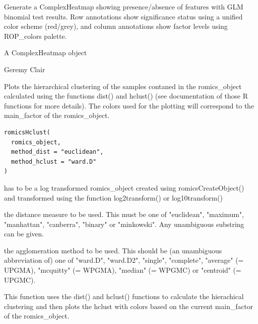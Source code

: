 \documentclass[a4paper]{book}
\begin{document}
%
\begin{Details}
Generate a ComplexHeatmap showing presence/absence of features with GLM binomial test results. Row annotations show significance status using a unified color scheme (red/grey), and column annotations show factor levels using ROP\_colors palette.
\end{Details}
%
\begin{Value}
A ComplexHeatmap object
\end{Value}
%
\begin{Author}
Geremy Clair
\end{Author}
%
\begin{Description}
Plots the hierarchical clustering of the samples contaned in the romics\_object calculated using the functions dist() and hclust() (see documentation of those R functions for more details). The colors used for the plotting will correspond to the main\_factor of the romics\_object.
\end{Description}
%
\begin{Usage}
\begin{verbatim}
romicsHclust(
  romics_object,
  method_dist = "euclidean",
  method_hclust = "ward.D"
)
\end{verbatim}
\end{Usage}
%
\begin{Arguments}
\begin{ldescription}
\item[\code{romics\_object}] has to be a log transformed romics\_object created using romicsCreateObject() and transformed using the function log2transform() or log10transform()

\item[\code{method\_dist}] the distance measure to be used. This must be one of "euclidean", "maximum", "manhattan", "canberra", "binary" or "minkowski". Any unambiguous substring can be given.

\item[\code{method\_hclust}] the agglomeration method to be used. This should be (an unambiguous abbreviation of) one of "ward.D", "ward.D2", "single", "complete", "average" (= UPGMA), "mcquitty" (= WPGMA), "median" (= WPGMC) or "centroid" (= UPGMC).
\end{ldescription}
\end{Arguments}
%
\begin{Details}
This function uses the dist() and hclust() functions to calculate the hierachical clustering and then plots the hclust with colors based on the current main\_factor of the romics\_object.
\end{Details}
\end{document}

